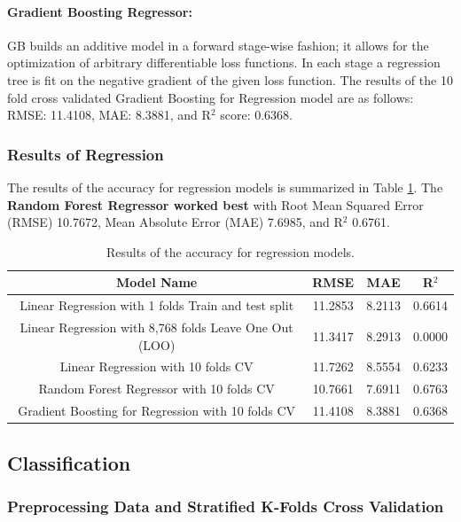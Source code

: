 \documentclass[11pt]{article}
\begin{document}
\paragraph*{Gradient Boosting Regressor:}
GB builds an additive model in a forward stage-wise fashion; it allows for the optimization of arbitrary differentiable loss functions. In each stage a regression tree is fit on the negative gradient of the given loss function.
%
The results of the 10 fold cross validated Gradient Boosting for Regression model are as follows:
RMSE:  11.4108, MAE:  8.3881, and R$^{2}$ score:  0.6368.

\subsubsection{Results of Regression}

The results of the accuracy for regression models is summarized in Table \ref{table:acc_regression}. The \textbf{Random Forest Regressor worked best} with Root Mean Squared Error (RMSE) 10.7672, Mean Absolute Error (MAE) 7.6985, and R$^{2}$ 0.6761.

\begin{table}[h]
\centering
\begin{tabular}{||c|c|c|c||}
  \hline
Model Name & RMSE & MAE & R$^{2}$\\
  \hline
Linear Regression with 1 folds Train and test split & 11.2853 &  8.2113 & 0.6614\\
\hline
Linear Regression with 8,768 folds Leave One Out (LOO) & 11.3417 & 8.2913 & 0.0000\\
\hline
Linear Regression with 10 folds CV & 11.7262 & 8.5554 &  0.6233\\
\hline
\cellcolor{red!25}Random Forest Regressor with 10 folds CV & \cellcolor{red!25}10.7661 & \cellcolor{red!25}7.6911 &  \cellcolor{red!25}0.6763\\
\hline
Gradient Boosting for Regression with 10 folds CV & 11.4108 & 8.3881 & 0.6368\\
  \hline
\end{tabular}
\caption{Results of the accuracy for regression models.}
\label{table:acc_regression}
\end{table}

\subsection{Classification}

\subsubsection{Preprocessing Data and Stratified K-Folds Cross Validation}
\end{document}
